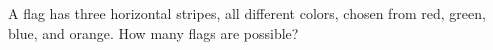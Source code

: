 A flag has three horizontal stripes, all different colors, chosen from red, green, blue, and orange. How many flags are possible?
